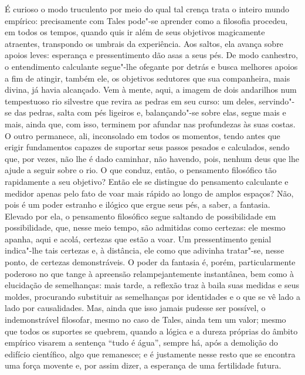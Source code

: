 É curioso o modo truculento por meio do qual tal crença trata o inteiro mundo
empírico: precisamente com Tales pode"-se aprender como a filosofia procedeu,
em todos os tempos, quando quis ir além de seus objetivos magicamente
atraentes, transpondo os umbrais da experiência. Aos saltos, ela avança sobre
apoios leves: esperança e pressentimento dão asas a seus pés. De modo
canhestro, o entendimento calculante segue"-lhe ofegante por detrás e busca
melhores apoios a fim de atingir, também ele, os objetivos sedutores que sua
companheira, mais divina, já havia alcançado. Vem à mente, aqui, a imagem de
dois andarilhos num tempestuoso rio silvestre que revira as pedras em seu
curso: um deles, servindo"-se das pedras, salta com pés ligeiros e,
balançando"-se sobre elas, segue mais e mais, ainda que, com isso, terminem
por afundar nas profundezas às suas costas. O outro permanece, ali,
inconsolado em todos os momentos, tendo antes que erigir fundamentos capazes
de suportar seus passos pesados e calculados, sendo que, por vezes, não lhe é
dado caminhar, não havendo, pois, nenhum deus que lhe ajude a seguir sobre o
rio. O que conduz, então, o pensamento filosófico tão rapidamente a seu
objetivo? Então ele se distingue do pensamento calculante e medidor apenas
pelo fato de voar mais rápido ao longo de amplos espaços? Não, pois é um
poder estranho e ilógico que ergue seus pés, a saber, a fantasia. Elevado por
ela, o pensamento filosófico segue saltando de possibilidade em
possibilidade, que, nesse meio tempo, são admitidas como certezas: ele mesmo
apanha, aqui e acolá, certezas que estão a \label{certezasque} voar. Um
pressentimento genial indica"-lhe tais certezas e, à distância, ele como que
adivinha tratar"-se, nesse ponto, de certezas demonstráveis. O poder da
fantasia é, porém, particularmente poderoso no que tange à apreensão
relampejantemente instantânea, bem como à elucidação de semelhanças: mais
tarde, a reflexão traz à baila suas medidas e seus moldes, procurando
substituir as semelhanças por \label{medidaseseusmoldes} identidades e o
que se vê lado a lado por causalidades. Mas, ainda que isso jamais pudesse
ser possível, o indemonstrável filosofar, mesmo no caso de Tales, ainda tem
um valor; mesmo que todos os suportes se quebrem, quando a lógica e a dureza
próprias do âmbito empírico visarem a sentença ``tudo é água'', sempre há,
após a demolição do edifício científico, algo que remanesce; e é justamente
nesse resto que se encontra uma força movente e, por assim dizer, a esperança
de uma fertilidade futura.

